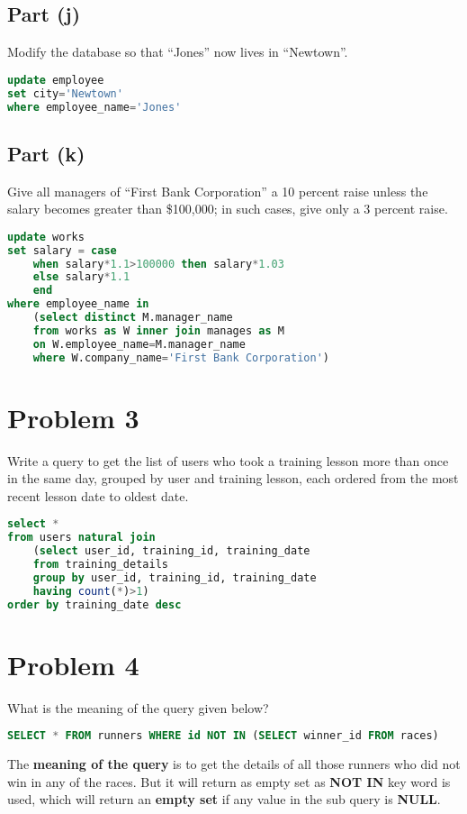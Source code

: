 \documentclass{article}
\begin{document}
\subsection{Part (j)}
Modify the database so that “Jones” now lives in “Newtown”.
\begin{lstlisting}[language=sql]
update employee
set city='Newtown'
where employee_name='Jones'
\end{lstlisting}

\newpage
\subsection{Part (k)}
Give all managers of “First Bank Corporation” a 10 percent raise unless the salary becomes greater
than \$100,000; in such cases, give only a 3 percent raise.
\begin{lstlisting}[language=sql]
update works
set salary = case
    when salary*1.1>100000 then salary*1.03
    else salary*1.1
    end
where employee_name in 
    (select distinct M.manager_name
    from works as W inner join manages as M
    on W.employee_name=M.manager_name
    where W.company_name='First Bank Corporation')
\end{lstlisting}

\section{Problem 3}
Write a query to get the list of users who took a training lesson more than once in the same day, grouped by
user and training lesson, each ordered from the most recent lesson date to oldest date.
\begin{lstlisting}[language=sql]
select *
from users natural join 
    (select user_id, training_id, training_date
    from training_details
    group by user_id, training_id, training_date
    having count(*)>1)
order by training_date desc
\end{lstlisting}

\section{Problem 4}
What is the meaning of the query given below? 
\begin{lstlisting}[language=sql]
  SELECT * FROM runners WHERE id NOT IN (SELECT winner_id FROM races)
\end{lstlisting}
The \textbf{meaning of the query} is to get the details of all those runners who did not win in any of the races.
But it will return as empty set as \textbf{NOT IN} key word is used,
which will return an \textbf{empty set} if any value in the sub query is \textbf{NULL}.
\end{document}
